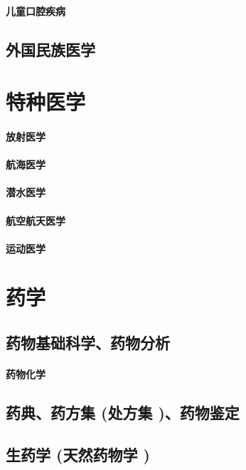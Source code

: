 \documentclass[UTF8]{../ApplicationUniverse}
\begin{document}
    \subsubsection{儿童口腔疾病}
\section{外国民族医学}






\chapter{特种医学}
\subsubsection{放射医学}
\subsubsection{航海医学}
\subsubsection{潜水医学}
\subsubsection{航空航天医学}
\subsubsection{运动医学}






\chapter{药学}
\section{药物基础科学、药物分析}
    \subsubsection{药物化学}
\section{药典、药方集 (处方集 )、药物鉴定}
\section{生药学 (天然药物学 )}
\end{document}
